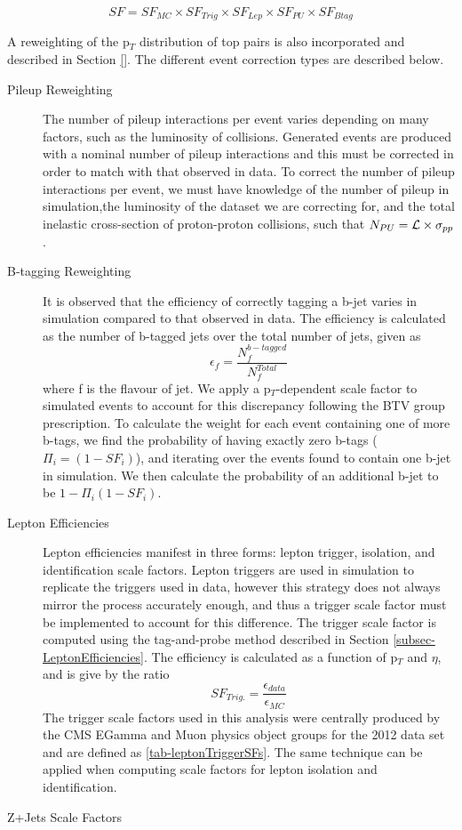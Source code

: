 \begin{equation}
SF = SF_{MC} \times SF_{Trig} \times SF_{Lep} \times SF_{PU} \times SF_{Btag}
\end{equation} \label{eqn-SFProduct}

A reweighting of the p$_T$ distribution of top pairs is also incorporated and described in Section \ref{}. The different event correction types are described below.

\begin{description}
	\item[Pileup Reweighting] The number of pileup interactions per event varies depending on many factors, such as the luminosity of collisions. Generated events are produced with a nominal number of pileup interactions and this must be corrected in order to match with that observed in data. To correct the number of pileup interactions per event, we must have knowledge of the number of pileup in simulation,the luminosity of the dataset we are correcting for, and the total inelastic cross-section of proton-proton collisions, such that $N_{PU} = \mathcal{L} \times \sigma_{pp}$.    
	\item[B-tagging Reweighting] It is observed that the efficiency of correctly tagging a b-jet varies in simulation compared to that observed in data. The efficiency is calculated as the number of b-tagged jets over the total number of jets, given as 
	\begin{equation}
	\epsilon_f = \frac{N_f^{b-tagged}}{N_{f}^{Total}}
	\end{equation}
	where f is the flavour of jet. We apply a p$_T$-dependent scale factor to simulated events to account for this discrepancy \cite{CMS-DP-2013-005} following the BTV group prescription. To calculate the weight for each event containing one of more b-tags, we find the probability of having exactly zero b-tags ($\Pi_i = \left(1 - SF_i\right)$), and iterating over the events found to contain one b-jet in simulation. We then calculate the probability of an additional b-jet to be $1 - \Pi_i\left(1 - SF_i\right)$.  
	\item[Lepton Efficiencies] Lepton efficiencies manifest in three forms: lepton trigger, isolation, and identification scale factors. Lepton triggers are used in simulation to replicate the triggers used in data, however this strategy does not always mirror the process accurately enough, and thus a trigger scale factor must be implemented to account for this difference. The trigger scale factor is computed using the tag-and-probe method \cite{tagandprobe} described in Section \ref{subsec-LeptonEfficiencies}. The efficiency is calculated as a function of p$_T$ and $\eta$, and is give by the ratio
	\begin{equation}
	SF_{Trig.} = \frac{\epsilon_{data}}{\epsilon_{MC}}
	\end{equation}
	The trigger scale factors used in this analysis were centrally produced by the CMS EGamma and Muon physics object groups for the 2012 data set and are defined as \ref{tab-leptonTriggerSFs}. The same technique can be applied when computing scale factors for lepton isolation and identification.  
	\item[Z+Jets Scale Factors]
\end{description} 


